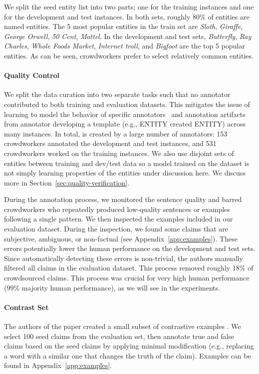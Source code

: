 We split the seed entity list into two parts; one for the training instances and one for the development and test instances. In both sets, roughly 80\% of entities are named entities. The 5 most popular entities in the train set are \emph{Sloth}, \emph{Giraffe}, \emph{George Orwell}, \emph{50 Cent}, \emph{Mattel}. In the development and test sets, \emph{Butterfly}, \emph{Ray Charles}, \emph{Whole Foods Market}, \emph{Internet troll}, and \emph{Bigfoot} are the top 5 popular entities. As can be seen, crowdworkers prefer to select relatively common entities.

\paragraph{Quality Control} 
We split the data curation into two separate tasks such that no annotator contributed to both training and evaluation datasets. This mitigates the issue of learning to model the behavior of specific annotators~\citep{Mor_Geva_2019} and annotation artifacts from annotator developing a template (e.g., ENTITY created ENTITY) across many instances. In total, \ours is created by a large number of annotators: 153 crowdworkers annotated the development and test instances, and 531 crowdworkers worked on the training instances. We also use disjoint sets of entities between training and dev/test data so a model trained on the dataset is not simply learning properties of the entities under discussion here. We discuss more in Section~\ref{sec:quality-verification}.

During the annotation process, we monitored the sentence quality and barred crowdworkers who repeatedly produced low-quality sentences or examples following a single pattern. We then inspected the examples included in our evaluation dataset. During the inspection, we found some claims that are subjective, ambiguous, or non-factual (see Appendix~\ref{app:examples}). These errors potentially lower the human performance on the development and test sets. Since automatically detecting these errors is non-trivial, the authors manually filtered all claims in the evaluation dataset. This process removed roughly 18\% of crowdsourced claims. This process was crucial for very high human performance (99\% majority human performance), as we will see in the experiments. 

\paragraph{Contrast Set}
The authors of the paper created a small subset of contrastive examples \citep{Divyansh_Kaushik_2019, Matt_Gardner_2020}. We select 100 seed claims from the evaluation set, then annotate true and false claims based on the seed claims by applying minimal modification (e.g., replacing a word with a similar one that changes the truth of the claim). Examples can be found in Appendix~\ref{app:examples}.

